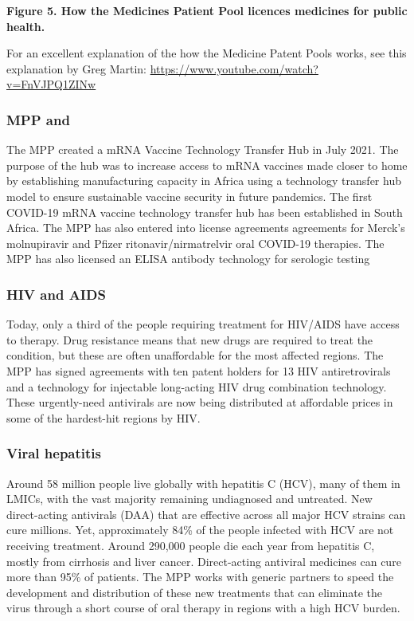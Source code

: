 \documentclass[
  11pt,
  paper=a4,
  ,captions=tableheading
]{scrartcl}
\begin{document}
\textbf{Figure 5. How the Medicines Patient Pool licences medicines for
public health.}

For an excellent explanation of the how the Medicine Patent Pools works,
see this explanation by Greg Martin:
\url{https://www.youtube.com/watch?v=FnVJPQ1ZINw}

\hypertarget{mpp-and}{%
\subsubsection*{MPP and}\label{mpp-and}}

The MPP created a mRNA Vaccine Technology Transfer Hub in July 2021. The
purpose of the hub was to increase access to mRNA vaccines made closer
to home by establishing manufacturing capacity in Africa using a
technology transfer hub model to ensure sustainable vaccine security in
future pandemics. The first COVID-19 mRNA vaccine technology transfer
hub has been established in South Africa. The MPP has also entered into
license agreements agreements for Merck's molnupiravir and Pfizer
ritonavir/nirmatrelvir oral COVID-19 therapies. The MPP has also
licensed an ELISA antibody technology for serologic testing

\hypertarget{hiv-and-aids}{%
\subsubsection*{HIV and AIDS}\label{hiv-and-aids}}

Today, only a third of the people requiring treatment for HIV/AIDS have
access to therapy. Drug resistance means that new drugs are required to
treat the condition, but these are often unaffordable for the most
affected regions. The MPP has signed agreements with ten patent holders
for 13 HIV antiretrovirals and a technology for injectable long-acting
HIV drug combination technology. These urgently-need antivirals are now
being distributed at affordable prices in some of the hardest-hit
regions by HIV.

\hypertarget{viral-hepatitis}{%
\subsubsection*{Viral hepatitis}\label{viral-hepatitis}}

Around 58 million people live globally with hepatitis C (HCV), many of
them in LMICs, with the vast majority remaining undiagnosed and
untreated. New direct-acting antivirals (DAA) that are effective across
all major HCV strains can cure millions. Yet, approximately 84\% of the
people infected with HCV are not receiving treatment. Around 290,000
people die each year from hepatitis C, mostly from cirrhosis and liver
cancer. Direct-acting antiviral medicines can cure more than 95\% of
patients. The MPP works with generic partners to speed the development
and distribution of these new treatments that can eliminate the virus
through a short course of oral therapy in regions with a high HCV
burden.
\end{document}
